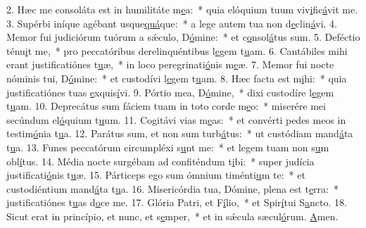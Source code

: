 2. Hæc me consoláta est in humilitáte m\uline{e}a:~* quia elóquium tuum viv\uline{i}fic\uline{á}vit me.
3. Supérbi iníque agébant usque\uline{quá}que:~* a lege autem tua non d\uline{e}clin\uline{á}vi.
4. Memor fui judiciórum tuórum a sǽculo, D\uline{ó}mine:~* et c\uline{o}nsol\uline{á}tus sum.
5. Deféctio ténu\uline{i}t me,~* pro peccatóribus derelinquéntibus l\uline{e}gem t\uline{u}am.
6. Cantábiles mihi erant justificatiónes t\uline{u}æ,~* in loco peregrinati\uline{ó}nis m\uline{e}æ.
7. Memor fui nocte nóminis tui, D\uline{ó}mine:~* et custodívi l\uline{e}gem t\uline{u}am.
8. Hæc facta est m\uline{i}hi:~* quia justificatiónes tuas \uline{e}xquis\uline{í}vi.
9. Pórtio mea, D\uline{ó}mine,~* dixi custodíre l\uline{e}gem t\uline{u}am.
10. Deprecátus sum fáciem tuam in toto corde m\uline{e}o:~* miserére mei secúndum el\uline{ó}quium t\uline{u}um.
11. Cogitávi vias m\uline{e}as:~* et convérti pedes meos in testim\uline{ó}nia t\uline{u}a.
12. Parátus sum, et non sum turb\uline{á}tus:~* ut custódiam mand\uline{á}ta t\uline{u}a.
13. Funes peccatórum circumpléxi s\uline{u}nt me:~* et legem tuam non s\uline{u}m obl\uline{í}tus.
14. Média nocte surgébam ad confiténdum t\uline{i}bi:~* super judícia justificati\uline{ó}nis t\uline{u}æ.
15. Párticeps ego sum ómnium timénti\uline{u}m te:~* et custodiéntium mand\uline{á}ta t\uline{u}a.
16. Misericórdia tua, Dómine, plena est t\uline{e}rra:~* justificatiónes t\uline{u}as d\uline{o}ce me.
17. Glória Patri, et F\uline{í}lio,~* et Spir\uline{í}tui S\uline{a}ncto.
18. Sicut erat in princípio, et nunc, et s\uline{e}mper,~* et in sǽcula sæcul\uline{ó}rum. \uline{A}men.
